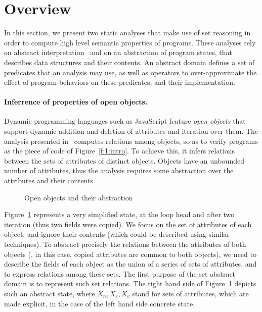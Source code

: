 \section{Overview}
\label{s:2:over}
In this section, we present two static analyses that make use of set
reasoning in order to compute high level semantic properties of
programs.
These analyses rely on abstract interpretation~\cite{cc:popl:77} and
on an abstraction of program states, that describes data structures
and their contents.
An abstract domain defines a set of predicates that an analysis may
use, as well as operators to over-approximate the effect of program
behaviors on these predicates, and their implementation.

\paragraph{Inferrence of properties of open objects.}
Dynamic programming languages such as JavaScript feature {\em open objects}
that support dynamic addition and deletion of attributes and iteration over
them.
The analysis presented in~\cite{hoo:14:sas} computes relations
among objects, so as to verify programs as the piece of code of
Figure~\ref{f:1:intro}.
To achieve this, it infers relations between the sets of attributes
of distinct objects.
Objects have an unbounded number of attributes, thus the analysis requires
some abstraction over the attributes and their contents.
\newcommand{\varsrc}{\cvar{src}}
\newcommand{\vardst}{\cvar{dst}}
\begin{figure}[t]
  \newcommand{\picscale}{0.82}
  \begin{center}
    \tikzpics{\picscale}{hoo-inv}
  \end{center}
  \caption{Open objects and their abstraction}
  \label{f:2:hoo}
\end{figure}
Figure~\ref{f:2:hoo} represents a very simplified state, at the loop
head and after two iteration (thus two fields were copied).
We focus on the set of attributes of each object, and ignore their
contents (which could be described using similar techniques).
To abstract precisely the relations between the attributes of both objects
(\ie, in this case, copied attributes are common to both objects), we need
to describe the fields of each object as the union of a series of sets of
attributes, and to express relations among these sets.
The first purpose of the set abstract domain is to represent such set
relations.
The right hand side of Figure~\ref{f:2:hoo} depicts such an abstract
state, where \( X_n, X_r, X_v \) stand for sets of attributes, which are
made explicit, in the case of the left hand side concrete state.

